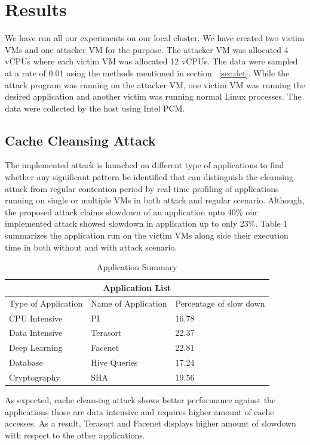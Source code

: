 \documentclass[a4paper,10pt]{article}
\begin{document}
\medskip

\section{Results}
We have run all our experiments on our local cluster. We have created two victim VMs and one attacker VM for the purpose. The attacker VM was allocated 4 vCPUs where each victim VM was allocated 12 vCPUs. The data were sampled at a rate of 0.01 using the methods mentioned in section ~\ref{sec:det}. While the attack program was running on the attacker VM, one victim VM was running the desired application and another victim was running normal Linux processes. The data were collected by the host using Intel PCM.
\subsection{Cache Cleansing Attack}
The implemented attack is launched on different type of applications to find whether any significant pattern be identified that can distinguish the cleansing attack from regular contention period by real-time profiling of applications running on single or multiple VMs in both attack and regular scenario. Although, the proposed attack claims slowdown of an application upto 40\% our implemented attack showed slowdown in application up to only 23\%. Table 1 summarizes the application run on the victim VMs along side their execution time in both without and with attack scenario.

\begin{table}[h!]
\label{table:summary}
\caption{Application Summary}
\begin{tabular}{ |p{3.5cm}||p{3.5cm}|p{3.5cm}|}
 \hline
 \multicolumn{3}{|c|}{Application List} \\
 \hline
 Type of Application & Name of Application & Percentage of slow down \\
 \hline
 CPU Intensive	& PI & 16.78\\
 \hline
 Data Intensive & Terasort & 22.37 \\
 \hline
 Deep Learning	& Facenet	& 22.81	\\
 \hline
 Database & Hive Queries & 17.24  \\
 \hline
 Cryptography &	SHA	&  19.56 \\
  \hline
 \end{tabular}
 \end{table}
 
As expected, cache cleansing attack shows better performance against the applications those are data intensive and requires higher amount of cache accesses. As a result, Terasort and Facenet displays higher amount of slowdown with respect to the other applications. 
\end{document}
